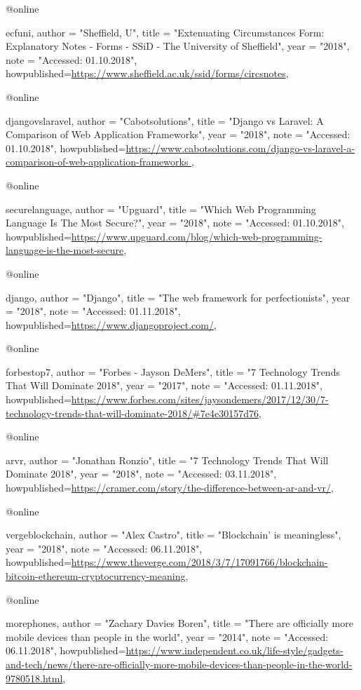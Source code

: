 
@online{ecfuni,
    author = "Sheffield, U",
    title = "Extenuating Circumstances Form: Explanatory Notes - Forms - SSiD - The University of Sheffield",
    year = "2018",
    note = "Accessed: 01.10.2018",
    howpublished={\url{https://www.sheffield.ac.uk/ssid/forms/circsnotes}},

}

@online{djangovslaravel,
    author = "Cabotsolutions",
    title = "Django vs Laravel: A Comparison of Web Application Frameworks",
    year = "2018",
    note = "Accessed: 01.10.2018",
    howpublished={\url{https://www.cabotsolutions.com/django-vs-laravel-a-comparison-of-web-application-frameworks }},

}

@online{securelanguage,
    author = "Upguard",
    title = "Which Web Programming Language Is The Most Secure?",
    year = "2018",
    note = "Accessed: 01.10.2018",
    howpublished={\url{https://www.upguard.com/blog/which-web-programming-language-is-the-most-secure}},

}

@online{django,
    author = "Django",
    title = "The web framework for perfectionists",
    year = "2018",
    note = "Accessed: 01.11.2018",
    howpublished={\url{https://www.djangoproject.com/}},

}

@online{forbestop7,
    author = "Forbes - Jayson DeMers",
    title = "7 Technology Trends That Will Dominate 2018",
    year = "2017",
    note = "Accessed: 01.11.2018",
    howpublished={\url{https://www.forbes.com/sites/jaysondemers/2017/12/30/7-technology-trends-that-will-dominate-2018/#7e4e30157d76}},

}
@online{arvr,
    author = "Jonathan Ronzio",
    title = "7 Technology Trends That Will Dominate 2018",
    year = "2018",
    note = "Accessed: 03.11.2018",
    howpublished={\url{https://cramer.com/story/the-difference-between-ar-and-vr/}},

}
@online{vergeblockchain,
    author = "Alex Castro",
    title = "Blockchain’ is meaningless",
    year = "2018",
    note = "Accessed: 06.11.2018",
    howpublished={\url{https://www.theverge.com/2018/3/7/17091766/blockchain-bitcoin-ethereum-cryptocurrency-meaning}},

}
@online{morephones,
    author = "Zachary Davies Boren",
    title = "There are officially more mobile devices than people in the world",
    year = "2014",
    note = "Accessed: 06.11.2018",
    howpublished={\url{https://www.independent.co.uk/life-style/gadgets-and-tech/news/there-are-officially-more-mobile-devices-than-people-in-the-world-9780518.html}},

}

